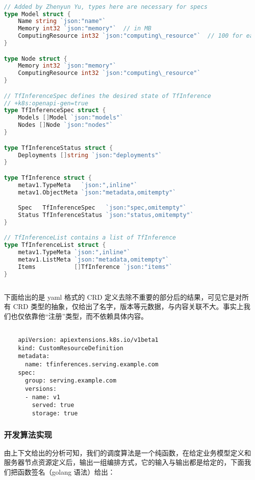 \begin{lstlisting}[language=go]

// Added by Zhenyun Yu, types here are necessary for specs
type Model struct {
    Name string `json:"name"`
    Memory int32 `json:"memory"`  // in MB
    ComputingResource int32 `json:"computing\_resource"`  // 100 for each core
}

type Node struct {
    Memory int32 `json:"memory"`
    ComputingResource int32 `json:"computing\_resource"`
}

// TfInferenceSpec defines the desired state of TfInference
// +k8s:openapi-gen=true
type TfInferenceSpec struct {
    Models []Model `json:"models"`
    Nodes []Node `json:"nodes"`
}

type TfInferenceStatus struct {
    Deployments []string `json:"deployments"`
}

type TfInference struct {
    metav1.TypeMeta   `json:",inline"`
    metav1.ObjectMeta `json:"metadata,omitempty"`

    Spec   TfInferenceSpec   `json:"spec,omitempty"`
    Status TfInferenceStatus `json:"status,omitempty"`
}

// TfInferenceList contains a list of TfInference
type TfInferenceList struct {
    metav1.TypeMeta `json:",inline"`
    metav1.ListMeta `json:"metadata,omitempty"`
    Items           []TfInference `json:"items"`
}
    
\end{lstlisting}

下面给出的是 yaml 格式的 CRD 定义去除不重要的部分后的结果，可见它是对所有 CRD 类型的抽象，仅给出了名字，版本等元数据，与内容关联不大。事实上我们也仅依靠他“注册”类型，而不依赖具体内容。

\begin{lstlisting}

    apiVersion: apiextensions.k8s.io/v1beta1
    kind: CustomResourceDefinition
    metadata:
      name: tfinferences.serving.example.com
    spec:
      group: serving.example.com
      versions:
      - name: v1
        served: true
        storage: true

\end{lstlisting}

\subsubsection{开发算法实现}

由上下文给出的分析可知，我们的调度算法是一个纯函数，在给定业务模型定义和服务器节点资源定义后，输出一组编排方式，它的输入与输出都是给定的，下面我们把函数签名（golang 语法）给出：

